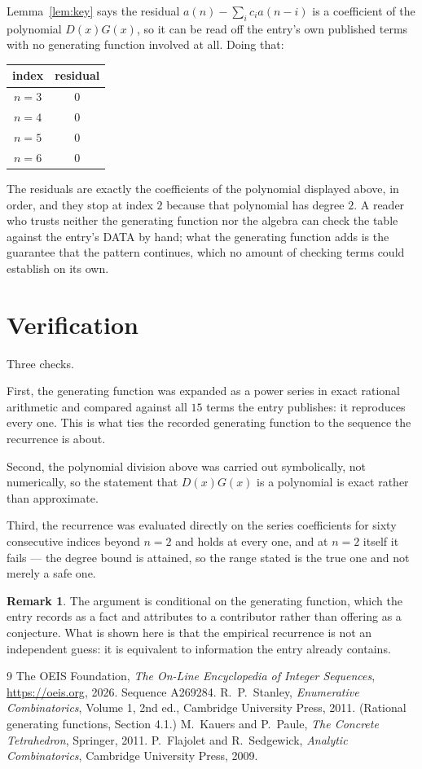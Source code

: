 \documentclass[11pt,a4paper]{article}
\theoremstyle{plain}
\theoremstyle{definition}
\newtheorem{remark}[theorem]{Remark}
\begin{document}
Lemma~\ref{lem:key} says the residual $a(n)-\sum_ic_ia(n-i)$ is a coefficient of the
polynomial $D(x)G(x)$, so it can be read off the entry's own published terms with no
generating function involved at all. Doing that:
\begin{center}
\begin{tabular}{cc}
index & residual \\ \hline
$n=3$ & $0$ \\
$n=4$ & $0$ \\
$n=5$ & $0$ \\
$n=6$ & $0$
\end{tabular}
\end{center}
The residuals are exactly the coefficients of the polynomial displayed above, in order, and
they stop at index $2$ because that polynomial has degree $2$. A reader who trusts
neither the generating function nor the algebra can check the table against the entry's DATA
by hand; what the generating function adds is the guarantee that the pattern continues, which
no amount of checking terms could establish on its own.

\section{Verification}

Three checks.

First, the generating function was expanded as a power series in exact rational arithmetic and
compared against all $15$ terms the entry publishes: it reproduces every one. This is
what ties the recorded generating function to the sequence the recurrence is about.

Second, the polynomial division above was carried out symbolically, not numerically, so the
statement that $D(x)G(x)$ is a polynomial is exact rather than approximate.

Third, the recurrence was evaluated directly on the series coefficients for sixty consecutive
indices beyond $n=2$ and holds at every one, and at $n=2$ itself it fails --- the
degree bound is attained, so the range stated is the true one and not merely a safe one.

\begin{remark}
The argument is conditional on the generating function, which the entry records as a fact and
attributes to a contributor rather than offering as a conjecture. What is shown here is that
the empirical recurrence is not an independent guess: it is equivalent to information the
entry already contains.
\end{remark}

\begin{thebibliography}{9}
 The OEIS Foundation, \emph{The On-Line Encyclopedia of Integer
Sequences}, \url{https://oeis.org}, 2026. Sequence A269284.
 R.~P.~Stanley, \emph{Enumerative Combinatorics}, Volume 1, 2nd ed.,
Cambridge University Press, 2011. (Rational generating functions, Section 4.1.)
 M.~Kauers and P.~Paule, \emph{The Concrete Tetrahedron}, Springer, 2011.
 P.~Flajolet and R.~Sedgewick, \emph{Analytic Combinatorics}, Cambridge
University Press, 2009.
\end{thebibliography}
\end{document}
